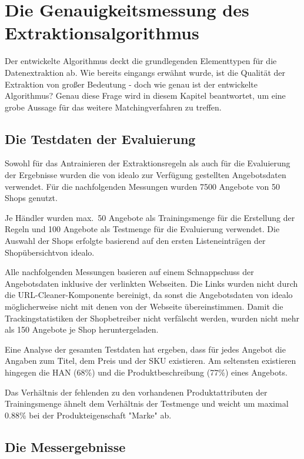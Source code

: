 \section{Die Genauigkeitsmessung des Extraktionsalgorithmus}
\label{sec:evaluierung}

Der entwickelte Algorithmus deckt die grundlegenden Elementtypen für die Datenextraktion ab.
Wie bereits eingangs erwähnt wurde, ist die Qualität der Extraktion von großer Bedeutung - doch wie genau ist der
entwickelte Algorithmus?
Genau diese Frage wird in diesem Kapitel beantwortet, um eine grobe Aussage für das weitere Matchingverfahren zu
treffen.

\subsection{Die Testdaten der Evaluierung}
\label{subsec:testdaten}
Sowohl für das Antrainieren der Extraktionsregeln als auch für die Evaluierung der Ergebnisse wurden die von idealo
zur Verfügung gestellten Angebotsdaten verwendet.
Für die nachfolgenden Messungen wurden 7500 Angebote von 50 Shops genutzt.

Je Händler wurden max.\ 50 Angebote als Trainingsmenge für die Erstellung der Regeln und 100 Angebote als Testmenge für
die Evaluierung verwendet.
Die Auswahl der Shops erfolgte basierend auf den ersten Listeneinträgen der Shopübersicht\footnotemark von idealo.

Alle nachfolgenden Messungen basieren auf einem Schnappschuss der Angebotsdaten inklusive der verlinkten Webseiten.
Die Links wurden nicht durch die URL-Cleaner-Komponente bereinigt, da sonst die Angebotsdaten von idealo
möglicherweise nicht mit denen von der Webseite übereinstimmen.
Damit die Trackingstatistiken der Shopbetreiber nicht verfälscht werden, wurden nicht mehr als 150 Angebote je Shop
heruntergeladen.

Eine Analyse der gesamten Testdaten hat ergeben, dass für jedes Angebot die Angaben zum Titel, dem Preis und der SKU
existieren.
Am seltensten existieren hingegen die HAN (68\%) und die Produktbeschreibung (77\%) eines Angebots.

Das Verhältnis der fehlenden zu den vorhandenen Produktattributen der Trainingsmenge ähnelt dem Verhältnis der
Testmenge und weicht um maximal 0.88\% bei der Produkteigenschaft "Marke" ab.

\subsection{Die Messergebnisse}
\label{subsec:genauigkeitsmessung}

